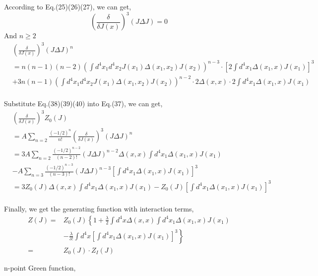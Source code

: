 \documentclass[a4paper]{article}
\begin{document}
According to Eq.(25)(26)(27), we can get, 
\begin{equation}
    (\frac{\delta}{\delta J(x)})^3(J\Delta J)=0
\end{equation}
And $n\ge2$
\begin{equation}
    \begin{split}
        &(\frac{\delta}{\delta J(x)})^3(J\Delta J)^n\\
        &=n(n-1)(n-2)(\int{d^4x_{1}d^4x_{2}J(x_{1})\Delta(x_{1},x_{2}) J(x_{2})})^{n-3}\cdot [2\int{d^4x_{1} \Delta(x_{1},x) J(x_{1})}]^3\\ 
        &+3n(n-1)(\int{d^4x_{1}d^4x_{2}J(x_{1})\Delta(x_{1},x_{2}) J(x_{2})})^{n-2}\cdot 2 \Delta(x,x)\cdot2\int{d^4x_{1} \Delta(x_{1},x)J(x_{1})}\\
    \end{split}
\end{equation}
\par Substitute Eq.(38)(39)(40) into Eq.(37), we can get,
\begin{equation}
    \begin{split}
         &(\frac{\delta}{\delta J(x)})^3Z_{0}(J)\\
         &=A\sum_{n=2}\frac{(-1/2)^n}{n!}(\frac{\delta}{\delta J(x)})^3(J\Delta J)^n\\
         &=3A\sum_{n=2}\frac{(-1/2)^{n-2}}{(n-2)!}(J\Delta J)^{n-2}\Delta(x,x)\int{d^4x_{1}\Delta(x_{1},x)J(x_{1})}\\
         &-A\sum_{n=3}\frac{(-1/2)^{n-3}}{(n-3)!}(J\Delta J)^{n-3}[\int{d^4x_{1}\Delta(x_{1},x)J(x_{1})}]^3\\
         &=3Z_{0}(J)\Delta(x,x)\int{d^4x_{1}\Delta(x_{1},x)J(x_{1})}-Z_{0}(J)[\int{d^4x_{1}\Delta(x_{1},x)J(x_{1})}]^3\\
    \end{split}
\end{equation}
\par Finally, we get the generating function with interaction terms,
\begin{equation}
    \begin{split}
        Z(J)=&Z_{0}(J)\left\{1+\frac{\lambda}{2}\int{d^4x\Delta(x,x)\int{d^4x_{1}\Delta(x_{1},x)J(x_{1})}}\right.\\
         &\left.-\frac{\lambda}{3!}\int{d^4x[\int{d^4x_{1}\Delta(x_{1},x)J(x_{1})}]^3}\right\}\\
         =&Z_{0}(J)\cdot Z_{I}(J)
    \end{split}
\end{equation}
\par n-point Green function,
\end{document}
